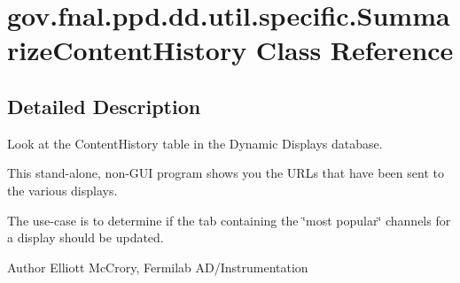 \hypertarget{classgov_1_1fnal_1_1ppd_1_1dd_1_1util_1_1specific_1_1SummarizeContentHistory}{\section{gov.\-fnal.\-ppd.\-dd.\-util.\-specific.\-Summarize\-Content\-History Class Reference}
\label{classgov_1_1fnal_1_1ppd_1_1dd_1_1util_1_1specific_1_1SummarizeContentHistory}
}


\subsection{Detailed Description}
Look at the Content\-History table in the Dynamic Displays database.

This stand-\/alone, non-\/\-G\-U\-I program shows you the U\-R\-Ls that have been sent to the various displays.

The use-\/case is to determine if the tab containing the \char`\"{}most popular\char`\"{} channels for a display should be updated.

\begin{DoxyAuthor}{Author}
Elliott Mc\-Crory, Fermilab A\-D/\-Instrumentation 
\end{DoxyAuthor}
